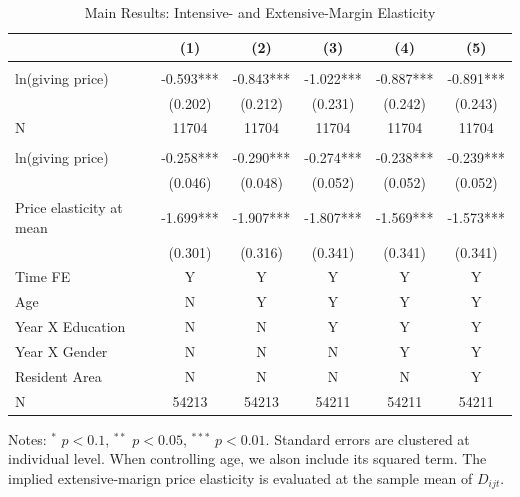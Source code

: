 \documentclass[ review  , 3p ]{elsarticle}
\begin{document}
  \begin{table}

  \caption{\label{tab:kableEstimateElasticityPart2}Main Results: Intensive- and Extensive-Margin Elasticity}
  \centering
  \begin{threeparttable}
  \begin{tabular}[t]{lccccc}
  \toprule
   & (1) & (2) & (3) & (4) & (5)\\
  \midrule
  \addlinespace[0.3em]
  \multicolumn{6}{l}{\textbf{Intensive-Margin Elasticity}}\\
  \hspace{1em}ln(giving price) & -0.593*** & -0.843*** & -1.022*** & -0.887*** & -0.891***\\
  \hspace{1em} & (0.202) & (0.212) & (0.231) & (0.242) & (0.243)\\
  \hspace{1em}N & 11704 & 11704 & 11704 & 11704 & 11704\\
  \addlinespace[0.3em]
  \multicolumn{6}{l}{\textbf{Extensive-Margin Elasticity}}\\
  \hspace{1em}ln(giving price) & -0.258*** & -0.290*** & -0.274*** & -0.238*** & -0.239***\\
  \hspace{1em} & (0.046) & (0.048) & (0.052) & (0.052) & (0.052)\\
  \hspace{1em}Price elasticity at mean & -1.699*** & -1.907*** & -1.807*** & -1.569*** & -1.573***\\
  \hspace{1em} & (0.301) & (0.316) & (0.341) & (0.341) & (0.341)\\
  \hspace{1em}Time FE & Y & Y & Y & Y & Y\\
  \hspace{1em}Age & N & Y & Y & Y & Y\\
  \hspace{1em}Year X Education & N & N & Y & Y & Y\\
  \hspace{1em}Year X Gender & N & N & N & Y & Y\\
  \hspace{1em}Resident Area & N & N & N & N & Y\\
  \hspace{1em}N & 54213 & 54213 & 54211 & 54211 & 54211\\
  \bottomrule
  \end{tabular}
  \begin{tablenotes}
  \item Notes: $^{*}$ $p < 0.1$, $^{**}$ $p < 0.05$, $^{***}$ $p < 0.01$. Standard errors are clustered at individual level. When controlling age, we alson include its squared term. The implied extensive-marign price elasticity is evaluated at the sample mean of $D_{ijt}$.
  \end{tablenotes}
  \end{threeparttable}
  \end{table}
\end{document}
